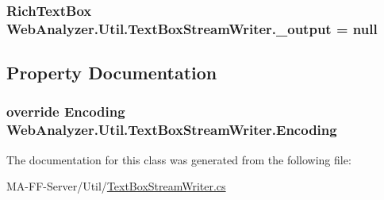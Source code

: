 \subsubsection[{\+\_\+output}]{\setlength{\rightskip}{0pt plus 5cm}Rich\+Text\+Box Web\+Analyzer.\+Util.\+Text\+Box\+Stream\+Writer.\+\_\+output = null\hspace{0.3cm}{\ttfamily [private]}}\label{class_web_analyzer_1_1_util_1_1_text_box_stream_writer_adacb29454407dc6e1513ce1eb172e6f8}


\subsection{Property Documentation}
\hypertarget{class_web_analyzer_1_1_util_1_1_text_box_stream_writer_ac030314a6b1db8711944c33c49c05f6b}{}
\subsubsection[{Encoding}]{\setlength{\rightskip}{0pt plus 5cm}override Encoding Web\+Analyzer.\+Util.\+Text\+Box\+Stream\+Writer.\+Encoding\hspace{0.3cm}{\ttfamily [get]}}\label{class_web_analyzer_1_1_util_1_1_text_box_stream_writer_ac030314a6b1db8711944c33c49c05f6b}


The documentation for this class was generated from the following file\+:\begin{DoxyCompactItemize}
\item 
M\+A-\/\+F\+F-\/\+Server/\+Util/\hyperlink{_text_box_stream_writer_8cs}{Text\+Box\+Stream\+Writer.\+cs}\end{DoxyCompactItemize}
